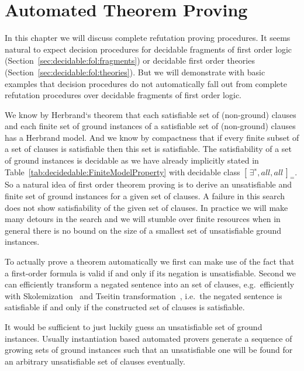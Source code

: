 
\chapter{Automated Theorem Proving}\label{chapter:automation}



In this chapter we will discuss complete refutation proving procedures.
It seems natural to expect decision procedures
for decidable fragments of first order logic
(Section~\ref{sec:decidable:fol:fragments})
or decidable first order theories (Section~\ref{sec:decidable:fol:theories}).
But we will demonstrate with basic examples
that decision procedures do not automatically
fall out from complete refutation procedures
over decidable fragments of first order logic.

We know by Herbrand`s theorem
that each satisfiable set of (non-ground) clauses
and each finite set of ground instances of a satisfiable set of (non-ground) clauses
has a Herbrand model.
And we know by compactness
that if every finite subset of a set of clauses is satisfiable then this set is satisfiable.
The satisfiability of a set of ground instances is decidable
as we have already implicitly stated in Table~\vref{tab:decidedable:FiniteModelProperty}
with decidable class \( {[ \, \exists^{∗}, all, all \, ]}_{=} \).
So a natural idea of first order theorem proving
is to derive an unsatisfiable and finite set of ground instances for a given set of clauses.
A failure in this search does not show satisfiability of the given set of clauses.
In practice we will make many detours in the search and we will stumble over finite resources
when in general there is no bound on the size of a smallest set of unsatisfiable ground instances.

To actually prove a theorem automatically \cite{books/el/RobinsonV01}
we first can make use of the fact that a first-order formula is valid if and only if its negation is unsatisfiable.
Second we can efficiently transform a negated sentence into an
 set of clauses,
e.g.~efficiently with Skolemization~\cite{books/el/RV01/Hahnle01} 
and Tseitin transformation~\cite{tseitin70},
i.e.~the negated sentence is satisfiable if and only if the constructed 
set of clauses is satisfiable.

It would be sufficient to just luckily guess an unsatisfiable set of ground instances.
Usually instantiation based automated provers generate
a sequence of growing sets of ground instances
such that an unsatisfiable one will be found
for an arbitrary unsatisfiable set of clauses
eventually.

